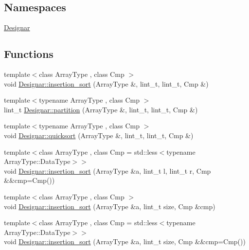 \subsection*{Namespaces}
\begin{DoxyCompactItemize}
\item 
 \hyperlink{namespace_designar}{Designar}
\end{DoxyCompactItemize}
\subsection*{Functions}
\begin{DoxyCompactItemize}
\item 
{\footnotesize template$<$class Array\+Type , class Cmp $>$ }\\void \hyperlink{namespace_designar_a9fec85a7dda46bb4840bf066c8483853}{Designar\+::insertion\+\_\+sort} (Array\+Type \&, lint\+\_\+t, lint\+\_\+t, Cmp \&)
\item 
{\footnotesize template$<$typename Array\+Type , class Cmp $>$ }\\lint\+\_\+t \hyperlink{namespace_designar_a43b31dd9df26bd0c268d2aa653de6cf0}{Designar\+::partition} (Array\+Type \&, lint\+\_\+t, lint\+\_\+t, Cmp \&)
\item 
{\footnotesize template$<$typename Array\+Type , class Cmp $>$ }\\void \hyperlink{namespace_designar_a2e26fd2dcbb26e5ffc96a960dd4caa94}{Designar\+::quicksort} (Array\+Type \&, lint\+\_\+t, lint\+\_\+t, Cmp \&)
\item 
{\footnotesize template$<$class Array\+Type , class Cmp  = std\+::less$<$typename Array\+Type\+::\+Data\+Type$>$$>$ }\\void \hyperlink{namespace_designar_ab2f897d6db2113316fee5efcd50a459d}{Designar\+::insertion\+\_\+sort} (Array\+Type \&a, lint\+\_\+t l, lint\+\_\+t r, Cmp \&\&cmp=Cmp())
\item 
{\footnotesize template$<$class Array\+Type , class Cmp $>$ }\\void \hyperlink{namespace_designar_a54b704ec22eb8fe7136b1bda64daf3a7}{Designar\+::insertion\+\_\+sort} (Array\+Type \&a, lint\+\_\+t size, Cmp \&cmp)
\item 
{\footnotesize template$<$class Array\+Type , class Cmp  = std\+::less$<$typename Array\+Type\+::\+Data\+Type$>$$>$ }\\void \hyperlink{namespace_designar_a8655d6fa8772dee92565bf7475e5612d}{Designar\+::insertion\+\_\+sort} (Array\+Type \&a, lint\+\_\+t size, Cmp \&\&cmp=Cmp())

\end{DoxyCompactItemize}
